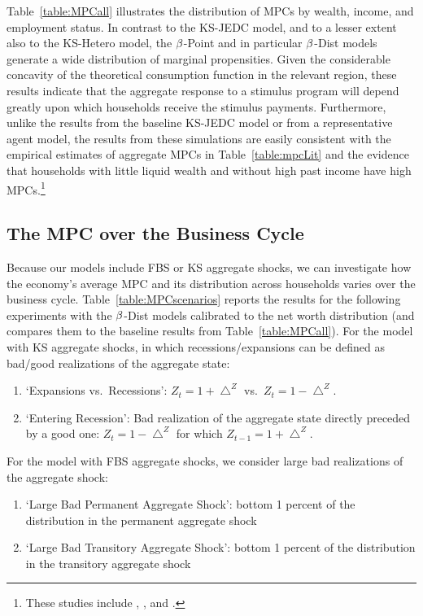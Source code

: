 \documentclass[12pt,titlepage]{econtex}
\renewcommand{\ptyLev}{\ensuremath{Z}} %
\begin{document}
Table~\ref{table:MPCall} illustrates the distribution of MPCs by wealth, income, and employment status. In contrast to the KS-JEDC model, and to a lesser extent also to the KS-Hetero model, the $\beta$-Point and in particular $\beta$-Dist models generate a wide distribution of marginal propensities.  Given the considerable concavity of the theoretical consumption function in the relevant region, these results indicate that the aggregate response to a stimulus program will depend greatly upon which households receive the stimulus payments.  Furthermore, unlike the results from the baseline KS-JEDC model or from a representative agent model, the results from these simulations are easily consistent with the empirical estimates of aggregate MPCs in Table~\ref{table:mpcLit} and the evidence that households with little liquid wealth and without high past income have high MPCs.\footnote{These studies include \citet{bppInequality}, \citet{brodaParker:stimulus2008}, \citet{leth-petersen:liquidity} and \citet{jappelliPistaferri_FPMPC}.}

\subsection{The MPC over the Business Cycle} \label{ss:BusinessCycle}

Because our models include FBS or KS aggregate shocks, we can investigate how the economy's
average MPC and its distribution across households varies over the business cycle. Table~\ref{table:MPCscenarios} reports
the results for the following experiments with the $\beta$-Dist models calibrated to the net worth distribution (and compares them to the baseline results from Table~\ref{table:MPCall}). For the model with KS aggregate shocks, in which recessions/expansions can be defined as bad/good realizations of the aggregate state:
\begin{enumerate}
\item `Expansions vs.\ Recessions': $\ptyLev_{t}=1+\bigtriangleup ^{\ptyLev}$ vs.\ $\ptyLev_{t}=1-\bigtriangleup ^{\ptyLev}$.
\item `Entering Recession': Bad realization of the aggregate state directly preceded by a good one: $\ptyLev_{t}=1-\bigtriangleup ^{\ptyLev}$ for which $\ptyLev_{t-1}=1+\bigtriangleup ^{\ptyLev}$.
\end{enumerate}
For the model with FBS aggregate shocks, we consider large bad realizations of the aggregate shock:
\begin{enumerate}
\item `Large Bad Permanent Aggregate Shock': bottom 1 percent of the distribution in the permanent aggregate shock
\item `Large Bad Transitory Aggregate Shock': bottom 1 percent of the distribution in the transitory aggregate shock
\end{enumerate}
\end{document}
